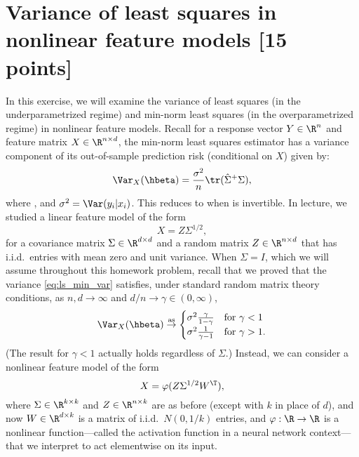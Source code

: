 \documentclass{article}
\begin{document}
\section{Variance of least squares in nonlinear feature models [15 points]} 

\def\asto{\overset{\mathrm{as}}{\to}}
\def\hSigma{\hat\Sigma}

In this exercise, we will examine the variance of least squares (in the
underparametrized regime) and min-norm least squares (in the overparametrized 
regime) in nonlinear feature models. Recall for a response vector $Y \in \R^n$
and feature matrix $X \in \R^{n \times d}$, the min-norm least squares estimator 
 has a variance component of its
out-of-sample prediction risk (conditional on $X$) given by:
\begin{equation}
\label{eq:ls_min_var}
\Var_X(\hbeta) = \frac{\sigma^2}{n} \tr (\hSigma^+ \Sigma),
\end{equation}
where \smash{$\hSigma = X^\T X/n$}, and $\sigma^2 = \Var(y_i | x_i)$. This
reduces to \smash{$\Var_X(\hbeta) = \frac{\sigma^2}{n} \tr (\hSigma^{-1}
  \Sigma)$} when \smash{$\hSigma$} is invertible. In lecture, we studied a
linear feature model of the form  
\begin{equation}
\label{eq:linear_features}
X = Z \Sigma^{1/2},
\end{equation}
for a covariance matrix $\Sigma \in \R^{d \times d}$ and a random matrix $Z \in
\R^{n \times d}$ that has i.i.d.\ entries with mean zero and unit variance. When
$\Sigma = I$, which we will assume throughout this homework problem, recall that
we proved that the variance \eqref{eq:ls_min_var} satisfies, under standard
random matrix theory conditions, as $n,d \to \infty$ and $d/n \to \gamma \in 
(0,\infty)$, 
\begin{equation}
\label{eq:ls_min_var_iso_limit}
\Var_X(\hbeta) \asto 
\begin{cases}
\sigma^2 \frac{\gamma}{1-\gamma} & \text{for $\gamma < 1$} \\ 
\sigma^2 \frac{1}{\gamma-1} & \text{for $\gamma > 1$}.
\end{cases}
\end{equation}
(The result for $\gamma < 1$ actually holds regardless of $\Sigma$.) Instead, we
can consider a nonlinear feature model of the form 
\begin{equation}
\label{eq:nonlinear_features}
X = \varphi(Z \Sigma^{1/2} W^\T),
\end{equation}
where $\Sigma \in \R^{k \times k}$ and $Z \in \R^{n \times k}$ are as before
(except with $k$ in place of $d$), and now $W \in \R^{d \times k}$ is a matrix
of i.i.d.\ $N(0,1/k)$ entries, and $\varphi : \R \to \R$ is a nonlinear
function---called the activation function in a neural network context---that we
interpret to act elementwise on its input.
\end{document}
